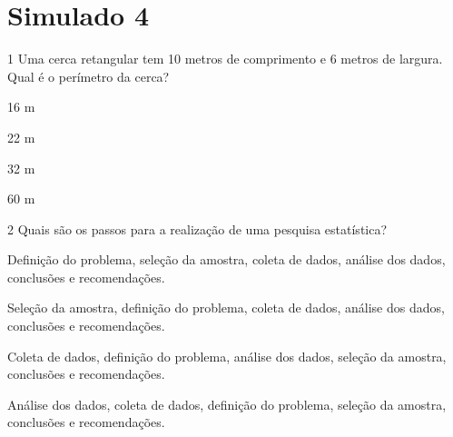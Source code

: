 






\section*{Simulado 4}

\num{1} Uma cerca retangular tem 10 metros de comprimento e 6 metros de
largura. Qual é o perímetro da cerca?
\item 16 m
\item 22 m
\item 32 m
\item 60 m







\num{2} Quais são os passos para a realização de uma pesquisa estatística?
\item Definição do problema, seleção da amostra, coleta de dados, análise
dos dados, conclusões e recomendações.
\item Seleção da amostra, definição do problema, coleta de dados, análise
dos dados, conclusões e recomendações.
\item Coleta de dados, definição do problema, análise dos dados, seleção da
amostra, conclusões e recomendações.
\item Análise dos dados, coleta de dados, definição do problema, seleção da
amostra, conclusões e recomendações.

